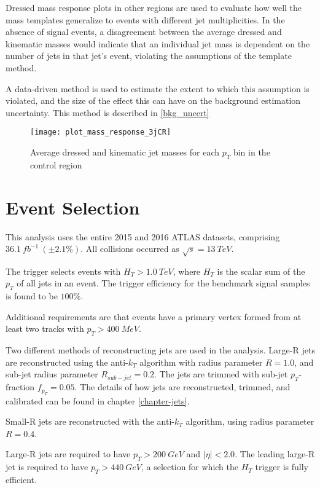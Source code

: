 Dressed mass response plots in other regions are used to evaluate how
well the mass templates generalize to events with different jet multiplicities. In the absence of
signal events, a disagreement between the average dressed and
kinematic masses would indicate that an individual jet mass is
dependent on the number of jets in that jet's event, violating
the assumptions of the template method.

A data-driven method is used to estimate the extent to which this
assumption is violated, and the size of the effect this can have on
the background estimation uncertainty. This method is described in
\ref{bkg_uncert}

\begin{figure}[h]
\texttt{[image: plot\_mass\_response\_3jCR]}
\centering
\caption{Average dressed and kinematic jet masses for each $p_T$ bin
  in the control region}
\label{fig:response_3jCR}

\end{figure}

\section{Event Selection}
This analysis uses the entire 2015 and 2016 ATLAS datasets, comprising
$36.1~fb^{-1}~(\pm2.1\%)$. All collisions occurred as
$\sqrt{s}=13~TeV$. 

The trigger selects events with $H_{T}>1.0~TeV$, where $H_{T}$ is the
scalar sum of the $p_{T}$ of all jets in an event. The trigger
efficiency for the benchmark signal samples is found to be $100\%$.

Additional requirements are that events have a primary vertex formed
from at least two tracks with $p_{T}>400~MeV$.

Two different methods of reconstructing jets are used in the
analysis. Large-R jets are reconstructed using the anti-$k_{T}$
algorithm with radius parameter
$R=1.0$, and sub-jet radius parameter $R_{sub-jet}=0.2$. The jets are
trimmed with sub-jet $p_{T}$-fraction $f_{p_{T}}=0.05$. The details of
how jets are reconstructed, trimmed, and calibrated can be found in
chapter \ref{chapter-jets}.

Small-R jets are reconstructed with the anti-$k_{T}$ algorithm, using
radius parameter $R=0.4$. 

Large-R jets are required to have $p_{T}>200~GeV$ and
$|\eta|<2.0$. The leading large-R jet is required to have
$p_{T}>440~GeV$, a selection for which the $H_{T}$ trigger is fully
efficient.

